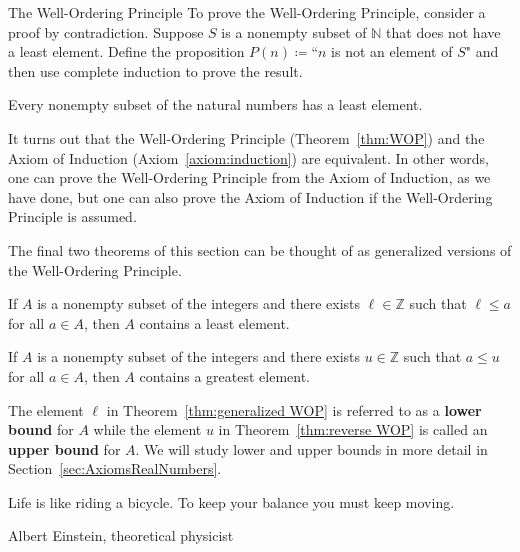 \begin{section}{The Well-Ordering Principle}
To prove the Well-Ordering Principle, consider a proof by contradiction. Suppose $S$ is a nonempty subset of $\mathbb{N}$ that does not have a least element.  Define the proposition $P(n)\coloneqq $``$n$ is not an element of $S$" and then use complete induction to prove the result.

\begin{theorem}\label{thm:WOP}
Every nonempty subset of the natural numbers has a least element.
\end{theorem}

It turns out that the Well-Ordering Principle (Theorem~\ref{thm:WOP}) and the Axiom of Induction (Axiom~\ref{axiom:induction}) are equivalent.  In other words, one can prove the Well-Ordering Principle from the Axiom of Induction, as we have done, but one can also prove the Axiom of Induction if the Well-Ordering Principle is assumed.

The final two theorems of this section can be thought of as generalized versions of the Well-Ordering Principle.

\begin{theorem}\label{thm:generalized WOP}
If $A$ is a nonempty subset of the integers and there exists $\ell\in \mathbb{Z}$ such that $\ell\leq a$ for all $a\in A$, then $A$ contains a least element.
\end{theorem}

\begin{theorem}\label{thm:reverse WOP}
If $A$ is a nonempty subset of the integers and there exists $u\in \mathbb{Z}$ such that $a\leq u$ for all $a\in A$, then $A$ contains a greatest element.
\end{theorem}

The element $\ell$ in Theorem~\ref{thm:generalized WOP} is referred to as a \textbf{lower bound} for $A$ while the element $u$ in Theorem~\ref{thm:reverse WOP} is called an \textbf{upper bound} for $A$. We will study lower and upper bounds in more detail in Section~\ref{sec:AxiomsRealNumbers}.

\epigraph{Life is like riding a bicycle. To keep your balance you must keep moving.}{Albert Einstein, theoretical physicist}

\end{section}